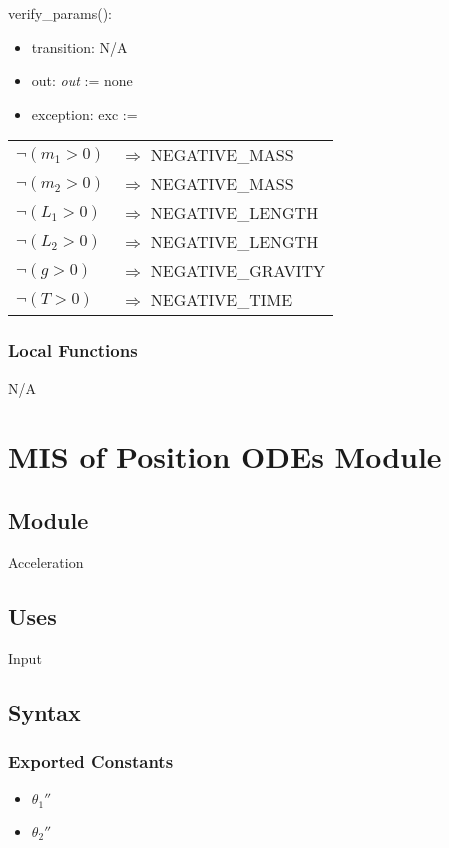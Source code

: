 \documentclass[12pt, titlepage]{article}
\begin{document}
\noindent verify\_params():
\begin{itemize}
\item transition: N/A
\item out: \textit{out} := none
\item exception: exc := 
\end{itemize}
\noindent \begin{longtable*}[l]{l l} 
$\neg (m_1 > 0)$ & $\Rightarrow$ NEGATIVE\_MASS\\
$\neg (m_2 > 0)$ & $\Rightarrow$ NEGATIVE\_MASS\\
$\neg (L_1 > 0)$ & $\Rightarrow$ NEGATIVE\_LENGTH\\
$\neg (L_2 > 0)$ & $\Rightarrow$ NEGATIVE\_LENGTH\\
$\neg (g > 0)$ & $\Rightarrow$ NEGATIVE\_GRAVITY\\
$\neg (T> 0)$ & $\Rightarrow$ NEGATIVE\_TIME\\
\end{longtable*}

\subsubsection{Local Functions}
N/A

\newpage


\section{MIS of Position ODEs Module} \label{POModule} 
 
\subsection{Module}
Acceleration

\subsection{Uses}
Input

\subsection{Syntax}

\subsubsection{Exported Constants}
\begin{itemize}
  \item ${\theta_1}''$
  \item ${\theta_2}''$
\end{itemize}
\end{document}
